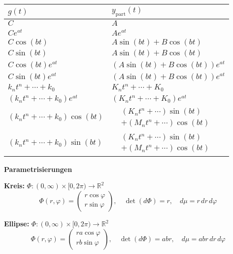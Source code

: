\begin{center}
\renewcommand{\arraystretch}{1.4}
\begin{tabular}{|
  >{\centering\arraybackslash}m{4cm}|
  >{\centering\arraybackslash}m{4cm}|
}
\hline
$g(t)$ & $y_{\text{part}}(t)$ \\
\hline
$C$ & $A$ \\
$Ce^{at}$ & $Ae^{at}$ \\
$C\cos(bt)$ & $A\sin(bt) + B\cos(bt)$ \\
$C\sin(bt)$ & $A\sin(bt) + B\cos(bt)$ \\
$C\cos(bt)e^{at}$ & $(A\sin(bt) + B\cos(bt))e^{at}$ \\
$C\sin(bt)e^{at}$ & $(A\sin(bt) + B\cos(bt))e^{at}$ \\
$k_nt^n + \cdots + k_0$ & $K_nt^n + \cdots + K_0$ \\
$(k_nt^n + \cdots + k_0)e^{at}$ & $(K_nt^n + \cdots + K_0)e^{at}$ \\
$(k_nt^n + \cdots + k_0)\cos(bt)$ &
$\begin{aligned}
&(K_nt^n + \cdots)\sin(bt)\\
&+ (M_nt^n + \cdots)\cos(bt)
\end{aligned}$ \\
$(k_nt^n + \cdots + k_0)\sin(bt)$ &
$\begin{aligned}
&(K_nt^n + \cdots)\sin(bt)\\
&+ (M_nt^n + \cdots)\cos(bt)
\end{aligned}$ \\
\hline
\end{tabular}
\end{center}


\textbf{Parametrisierungen}

\vspace{0.5em}

\textbf{Kreis:} $\Phi : (0, \infty) \times [0, 2\pi) \to \mathbb{R}^2$
\[
\Phi(r, \varphi) = \begin{pmatrix} r\cos\varphi \\ r\sin\varphi \end{pmatrix}, \quad
\det(d\Phi) = r, \quad
d\mu = r\,dr\,d\varphi
\]

\textbf{Ellipse:} $\Phi : (0, \infty) \times [0, 2\pi) \to \mathbb{R}^2$
\[
\Phi(r, \varphi) = \begin{pmatrix} ra\cos\varphi \\ rb\sin\varphi \end{pmatrix}, \quad
\det(d\Phi) = abr, \quad
d\mu = abr\,dr\,d\varphi
\]

